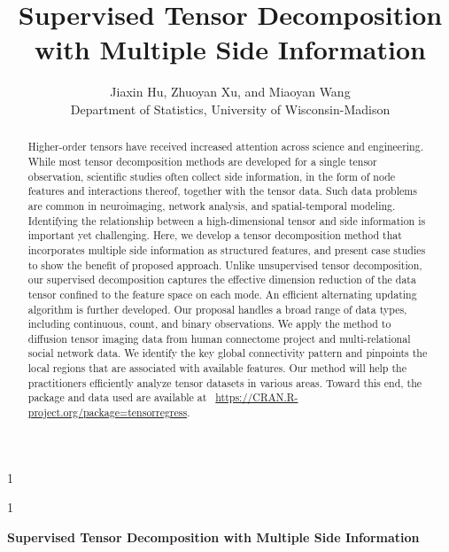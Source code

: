 \documentclass[12pt]{article}
\newcommand{\blind}{1}
\theoremstyle{plain}
\theoremstyle{definition}
\begin{document}
%

\def\spacingset#1{\renewcommand{\baselinestretch}%
{#1}\small\normalsize} \spacingset{1}



\blind
{
  \title{\bf Supervised Tensor Decomposition with Multiple Side Information}
  \author{Jiaxin Hu, Zhuoyan Xu, and Miaoyan Wang\\
    Department of Statistics, University of Wisconsin-Madison}
  \maketitle
} \fi

\blind
{
  \bigskip
  \bigskip
  \bigskip
  \begin{center}
    {\LARGE\bf Supervised Tensor Decomposition with Multiple Side Information}
\end{center}
  \medskip
} \fi

\bigskip
\begin{abstract}
Higher-order tensors have received increased attention across science and engineering. While most tensor decomposition methods are developed for a single tensor observation, scientific studies often collect side information, in the form of node features and interactions thereof, together with the tensor data. Such data problems are common in neuroimaging, network analysis, and spatial-temporal modeling. Identifying the relationship between a high-dimensional tensor and side information is important yet challenging. Here, we develop a tensor decomposition method that incorporates multiple side information as structured features, and present case studies to show the benefit of proposed approach. Unlike unsupervised tensor decomposition, our supervised decomposition captures the effective dimension reduction of the data tensor confined to the feature space on each mode. An efficient alternating updating algorithm is further developed. Our proposal handles a broad range of data types, including continuous, count, and binary observations. We apply the method to diffusion tensor imaging data from human connectome project and multi-relational social network data. We identify the key global connectivity pattern and pinpoints the local regions that are associated with available features. Our method will help the practitioners efficiently analyze tensor datasets in various areas. Toward this end, the package and data used are available at ~\url{https://CRAN.R-project.org/package=tensorregress}.

\end{abstract}
\end{document}
